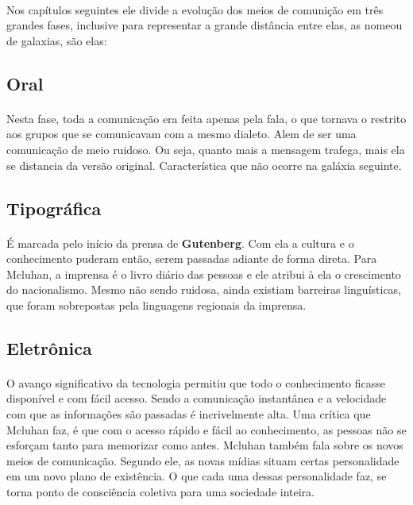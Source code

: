 \documentclass[12pt,a4paper]{article}
\begin{document}
\paragraph{}
Nos capítulos seguintes ele divide a evolução dos meios de comunição \cite{youtube:abc_monday_conference} em três grandes fases, inclusive para representar a grande distância entre elas, as nomeou de galaxias, são elas:

\subsection{Oral}
\paragraph{}
Nesta fase, toda a comunicação era feita apenas pela fala, o que tornava o  restrito aos grupos que se comunicavam com a mesmo dialeto. Alem de ser uma comunicação de meio ruidoso. Ou seja, quanto mais a mensagem trafega, mais ela se distancia da versão original. Característica que não ocorre na galáxia seguinte.

\subsection{Tipográfica}

\paragraph{}
É marcada pelo início da prensa de \textbf{Gutenberg}.
Com ela a cultura e o conhecimento puderam então, serem passadas adiante de forma direta.
Para Mcluhan, a imprensa é o livro diário das pessoas e ele atribui à ela o crescimento do nacionalismo. 
Mesmo não sendo ruidosa, ainda existiam barreiras linguísticas, que foram sobrepostas pela linguagens regionais da imprensa.

\subsection{Eletrônica}
\paragraph{}
O avanço significativo da tecnologia permitiu que todo o conhecimento ficasse disponível e com fácil acesso.
Sendo a comunicação instantânea e a velocidade com que as informações são passadas é incrivelmente alta.
Uma crítica que Mcluhan\cite{wiki:marshall_mcluhan} faz, é que com o acesso rápido e fácil ao conhecimento, as pessoas não se esforçam tanto para memorizar como antes. \cite{ted:ted_talk_feats_of_memory_anyone_can_do}
Mcluhan também fala sobre os novos meios de comunicação.
Segundo ele, as novas mídias situam certas personalidade em um novo plano de existência.
O que cada uma dessas personalidade faz, se torna ponto de consciência coletiva para uma sociedade inteira.
\end{document}
